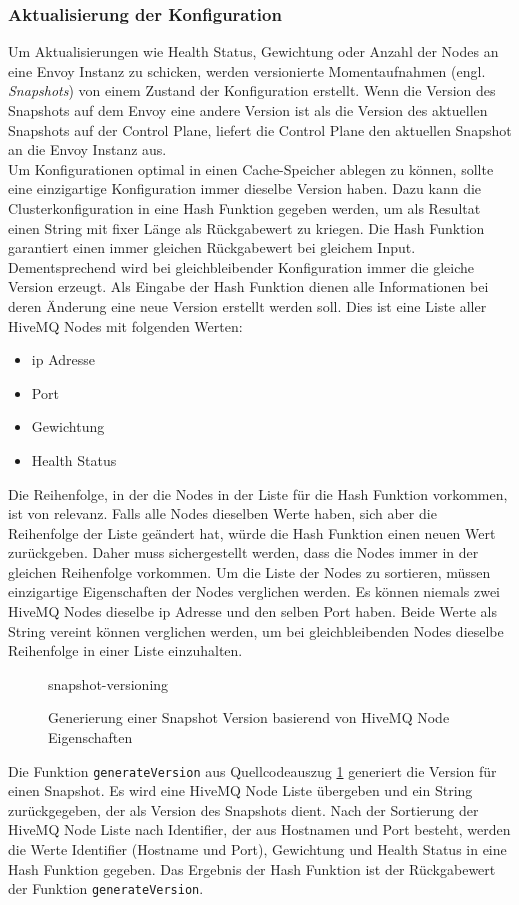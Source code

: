 \subsubsection{Aktualisierung der Konfiguration}
Um Aktualisierungen wie Health Status, Gewichtung oder Anzahl der Nodes an eine Envoy Instanz zu schicken, werden versionierte Momentaufnahmen (engl. \textit{Snapshots}) von einem Zustand der Konfiguration erstellt. Wenn die Version des Snapshots auf dem Envoy eine andere Version ist als die Version des aktuellen Snapshots auf der Control Plane, liefert die Control Plane den aktuellen Snapshot an die Envoy Instanz aus.
\\
Um Konfigurationen optimal in einen Cache-Speicher ablegen zu können, sollte eine einzigartige Konfiguration immer dieselbe Version haben.
Dazu kann die Clusterkonfiguration in eine Hash Funktion gegeben werden, um als Resultat einen String mit fixer Länge als Rückgabewert zu kriegen. Die Hash Funktion garantiert einen immer gleichen Rückgabewert bei gleichem Input. Dementsprechend wird bei gleichbleibender Konfiguration immer die gleiche Version erzeugt.
Als Eingabe der Hash Funktion dienen alle Informationen bei deren Änderung eine neue Version erstellt werden soll. Dies ist eine Liste aller HiveMQ Nodes mit folgenden Werten:
\begin{itemize}
  \item \ac{ip} Adresse
  \item Port
  \item Gewichtung
  \item Health Status
\end{itemize}
Die Reihenfolge, in der die Nodes in der Liste für die Hash Funktion vorkommen, ist von relevanz. Falls alle Nodes dieselben Werte haben, sich aber die Reihenfolge der Liste geändert hat, würde die Hash Funktion einen neuen Wert zurückgeben. Daher muss sichergestellt werden, dass die Nodes immer in der gleichen Reihenfolge vorkommen. Um die Liste der Nodes zu sortieren, müssen einzigartige Eigenschaften der Nodes verglichen werden.
Es können niemals zwei HiveMQ Nodes dieselbe \ac{ip} Adresse und den selben Port haben. Beide Werte als String vereint können verglichen werden, um bei gleichbleibenden Nodes dieselbe Reihenfolge in einer Liste einzuhalten.
\begin{figure}
    {snapshot-versioning}
    \caption{Generierung einer Snapshot Version basierend von HiveMQ Node Eigenschaften}
    \label{code:snapshot-versioning}
\end{figure}
Die Funktion \verb|generateVersion| aus Quellcodeauszug \ref{code:snapshot-versioning} generiert die Version für einen Snapshot. Es wird eine HiveMQ Node Liste übergeben und ein String zurückgegeben, der als Version des Snapshots dient. Nach der Sortierung der HiveMQ Node Liste nach Identifier, der aus Hostnamen und Port besteht, werden die Werte Identifier (Hostname und Port), Gewichtung und Health Status in eine Hash Funktion gegeben. Das Ergebnis der Hash Funktion ist der Rückgabewert der Funktion \verb|generateVersion|.

